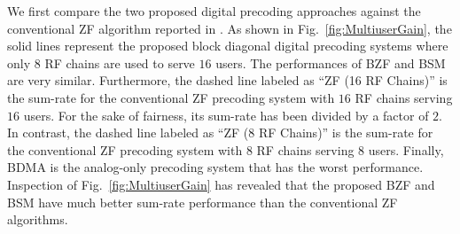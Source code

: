 \documentclass[conference]{IEEEtran}
\begin{document}
{We first compare the two proposed digital precoding approaches against the conventional ZF algorithm reported in \cite{alkhateeb2014channel}. As shown in Fig.~\ref{fig:MultiuserGain}, the solid lines represent the proposed block diagonal digital precoding systems where only $8$ RF chains are used to serve $16$ users. The performances of BZF and BSM are very similar. Furthermore, the dashed line labeled as ``ZF (16 RF Chains)'' is the sum-rate for the conventional ZF precoding system with $16$ RF chains serving $16$ users. For the sake of fairness, its sum-rate has been divided by a factor of $2$. In contrast, the dashed line labeled as ``ZF (8 RF Chains)'' is the sum-rate for the conventional ZF precoding system with $8$ RF chains serving $8$ users. Finally, BDMA is the analog-only precoding system that has the worst performance. Inspection of Fig.~\ref{fig:MultiuserGain} has revealed that the proposed BZF and BSM have much better sum-rate performance than the conventional ZF algorithms.

}
\end{document}
